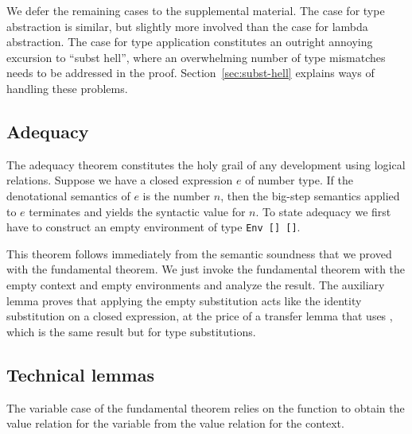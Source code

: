 \documentclass[sigplan,anonymous,review,screen]{acmart}
\begin{document}
We defer the remaining cases to the supplemental material.
The case for type abstraction is similar, but slightly more involved than the case
for lambda abstraction.
The case for type application constitutes an outright annoying
excursion to ``subst hell'', where an overwhelming number of type
mismatches needs to be addressed in the proof. Section~\ref{sec:subst-hell} explains
ways of handling these problems.

\subsection{Adequacy}
\label{sec:adequacy}

The adequacy theorem constitutes the holy grail of any development
using logical relations.
Suppose we have a closed expression $e$ of number type.
If the denotational semantics of $e$ is the number $n$, then the big-step
semantics applied to $e$ terminates and yields the syntactic value for
$n$.
To state adequacy we first have to construct an empty
environment of type \texttt{Env [] {\Anull} []}.

\begin{minipage}{0.3\linewidth}
  \FundamentalEmptyEnv
\end{minipage}
\begin{minipage}{0.3\linewidth}
  \FundamentalEmptyRelEnv
\end{minipage}
\begin{minipage}{0.3\linewidth}
  \FundamentalEmptyCSub
\end{minipage}
\FundamentalAdequacyType
This theorem follows immediately from the semantic soundness that we proved with the
fundamental theorem.
\FundamentalAdequacyBody
We just invoke the fundamental theorem with the empty context and empty
environments and analyze the result. The auxiliary lemma
{\ACsubClosed} proves that applying the empty substitution acts like
the identity substitution on a closed expression, at the price of a
transfer lemma that uses {\ATsubClosed}, which is the same result
but for type substitutions.
\FundamentalCsubClosed


\subsection{Technical lemmas}
\label{sec:technical-lemmas}

The variable case of the fundamental theorem relies on the function
{\AGLookup} to obtain the value relation for the variable from the
value relation for the context. 
\LRVrenMCGLookupType
\end{document}

